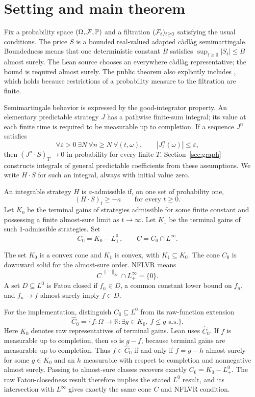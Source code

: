\section{Setting and main theorem}
Fix a probability space $(\Omega,\mathcal F,\mathbb P)$ and a filtration $(\mathcal F_t)_{t\geq0}$
satisfying the usual conditions. The price $S$ is a bounded real-valued
adapted c\`adl\`ag semimartingale. Boundedness means that one deterministic
constant $B$ satisfies $\sup_{t\geq0}|S_t|\leq B$ almost surely.
The Lean source chooses an everywhere c\`adl\`ag representative; the bound is
required almost surely. The public theorem also explicitly includes
, which holds because restrictions of a probability
measure to the filtration are finite.

Semimartingale behavior is expressed by the good-integrator property.
An elementary predictable strategy $J$ has a pathwise finite-sum integral;
its value at each finite time is required to be measurable up to completion.
If a sequence $J^n$ satisfies
\[
 \forall\varepsilon>0\ \exists N\ \forall n\geq N\ \forall(t,\omega),
 \qquad |J^n_t(\omega)|\leq\varepsilon,
\]
then $(J^n\cdot S)_T\to0$ in probability for every finite $T$.
Section~\ref{sec:graph} constructs integrals of general predictable coefficients
from these assumptions. We write $H\cdot S$ for such an integral, always with
initial value zero.

\begin{definition}
An integrable strategy $H$ is $a$-admissible if, on one set of probability one,
\[
 (H\cdot S)_t\geq-a\qquad\text{for every }t\geq0.
\]
Let $K_0$ be the terminal gains of strategies admissible for some finite
constant and possessing a finite almost-sure limit as $t\to\infty$.
Let $K_1$ be the terminal gains of such $1$-admissible strategies. Set
\[
 C_0=K_0-L^0_+,\qquad C=C_0\cap L^\infty.
\]
\end{definition}
The set $K_0$ is a convex cone and $K_1$ is convex, with $K_1\subseteq K_0$.
The cone $C_0$ is downward solid for the almost-sure order. NFLVR means
\[
 \overline C^{\,\|\cdot\|_\infty}\cap L^\infty_+=\{0\}.
\]
A set $D\subseteq L^0$ is Fatou closed if $f_n\in D$, a common constant lower
bound on $f_n$, and $f_n\to f$ almost surely imply $f\in D$.

For the implementation, distinguish $C_0\subseteq L^0$ from its raw-function
extension
\[
 \widehat C_0=\{f:\Omega\to\mathbb R:\exists g\in K_0,\ f\leq g\text{ a.s.}\}.
\]
Here $K_0$ denotes raw representatives of terminal gains.
Lean uses $\widehat C_0$. If $f$ is measurable up to completion, then so is
$g-f$, because terminal gains are measurable up to completion. Thus
$f\in\widehat C_0$ if and only if $f=g-h$ almost surely for some $g\in K_0$
and an $h$ measurable with respect to completion and nonnegative almost surely.
Passing to almost-sure
classes recovers exactly $C_0=K_0-L^0_+$. The raw Fatou-closedness result
therefore implies the stated $L^0$ result, and its intersection with $L^\infty$
gives exactly the same cone $C$ and NFLVR condition.


